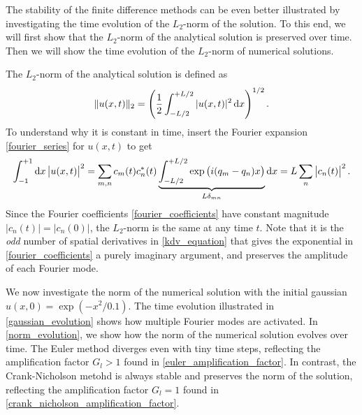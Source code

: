 The stability of the finite difference methods can be even better illustrated by investigating the time evolution of the $L_2$-norm of the solution.
To this end, we will first show that the $L_2$-norm of the analytical solution is preserved over time.
Then we will show the time evolution of the $L_2$-norm of numerical solutions.

The $L_2$-norm of the analytical solution is defined as
\begin{equation*}
	\Vert u(x,t) \Vert_2 = \left( \frac{1}{2} \int_{-L/2}^{+L/2} |u(x,t)|^2 \dif x \right)^{1/2}.
\end{equation*}
To understand why it is constant in time, insert the Fourier expansion \cref{fourier_series} for $u(x,t)$ to get
\begin{equation*}
\int_{-1}^{+1} \dif x \left| u(x,t) \right|^2 = \sum_{m,n} c_m(t) c_n^*(t) \underbrace{\int_{-L/2}^{+L/2} \exp{\left(i(q_m-q_n)x\right)}}_{L \delta_{m n}} \dif x = L \sum_n \left| c_n(t) \right|^2.
\end{equation*}
Since the Fourier coefficients \eqref{fourier_coefficients} have constant magnitude $|c_n(t)| = |c_n(0)|$, the $L_2$-norm is the same at any time $t$.
Note that it is the \emph{odd} number of spatial derivatives in \cref{kdv_equation} that gives the exponential in \cref{fourier_coefficients} a purely imaginary argument, and preserves the amplitude of each Fourier mode.

We now investigate the norm of the numerical solution with the initial gaussian $u(x, 0) = \exp \left( -x^2 / 0.1 \right)$.
The time evolution illustrated in \cref{gaussian_evolution} shows how multiple Fourier modes are activated.
In \cref{norm_evolution}, we show how the norm of the numerical solution evolves over time.
The Euler method diverges even with tiny time steps, reflecting the amplification factor $G_l > 1$ found in \cref{euler_amplification_factor}.
In contrast, the Crank-Nicholson metohd is always stable and preserves the norm of the solution, reflecting the amplification factor $G_l = 1$ found in \cref{crank_nicholson_amplification_factor}.

